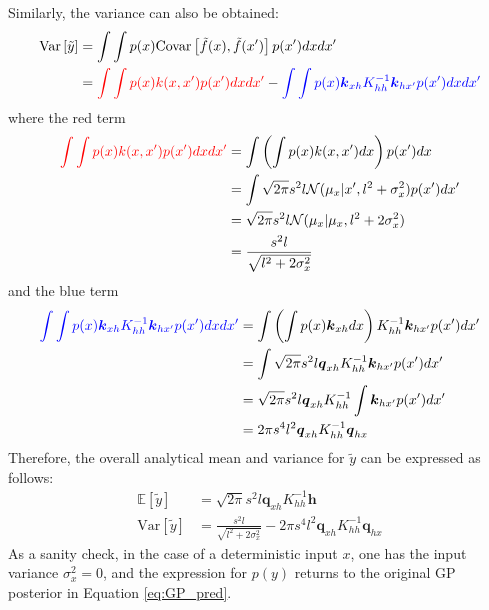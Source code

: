 \documentclass{article}
\begin{document}
Similarly, the variance can also be obtained:
\begin{equation}
    \begin{aligned}
        \text{Var}\left[\tilde{y}\right]&=\int\int p(x)\text{Covar}\left[\tilde{f}(x),\tilde{f}(x')\right]p(x')dxdx' \\
        &=\textcolor{red}{\int\int p(x)k(x,x')p(x')dxdx'}
        -\textcolor{blue}{\int\int p(x)\boldsymbol{k}_{xh}K_{hh}^{-1}\boldsymbol{k}_{hx'}p(x')dxdx'}
    \label{eq:incomplete_var}
    \end{aligned}
\end{equation}
where the red term
\begin{equation}
    \begin{aligned}
        \textcolor{red}{\int\int p(x)k(x,x')p(x')dxdx'}&=\int\left(\int p(x)k(x,x')dx\right)p(x')dx \\
        &=\int \sqrt{2\pi}s^2l\mathcal{N}(\mu_x|x',l^2 + \sigma_x^2)p(x')dx' \\
        &=\sqrt{2\pi}s^2l\mathcal{N}(\mu_x|\mu_x,l^2+2\sigma_x^2) \\
        &=\frac{s^2l}{\sqrt{l^2+2\sigma_x^2}}
    \end{aligned}
\end{equation}
and the blue term
\begin{equation}
    \begin{aligned}
        \textcolor{blue}{\int\int p(x)\boldsymbol{k}_{xh}K_{hh}^{-1}\boldsymbol{k}_{hx'}p(x')dxdx'}
        &=\int\left(\int p(x)\boldsymbol{k}_{xh}dx\right)K_{hh}^{-1}\boldsymbol{k}_{hx'}p(x')dx' \\
        &=\int \sqrt{2\pi}s^2l\boldsymbol{q}_{xh}K_{hh}^{-1}\boldsymbol{k}_{hx'}p(x')dx' \\
        &=\sqrt{2\pi}s^2l\boldsymbol{q}_{xh}K_{hh}^{-1} \int \boldsymbol{k}_{hx'}p(x')dx' \\
        &=2\pi s^4 l^2 \boldsymbol{q}_{xh}K_{hh}^{-1}\boldsymbol{q}_{hx}
    \end{aligned}
\end{equation}
Therefore, the overall analytical mean and variance for $\tilde{y}$ can be expressed as follows:
\begin{equation}
    \begin{aligned}
    \mathbb{E}\left[\tilde{y}\right]&=\sqrt{2\pi}s^2l\boldsymbol{q}_{xh}K_{hh}^{-1}\boldsymbol{h} \\
    \text{Var}\left[\tilde{y}\right]&=\frac{s^2l}{\sqrt{l^2+2\sigma_x^2}} - 2\pi s^4 l^2 \boldsymbol{q}_{xh}K_{hh}^{-1}\boldsymbol{q}_{hx}
    \end{aligned}
    \label{eq:gpneuron}
\end{equation}
As a sanity check, in the case of a deterministic input $x$, one has the input variance $\sigma_x^2=0$, and the expression for $p(y)$ returns to the original GP posterior in Equation \ref{eq:GP_pred}.
\end{document}
